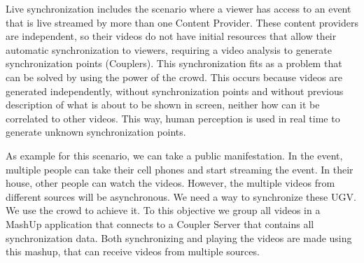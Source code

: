Live synchronization includes the scenario where a viewer has access to an event that is live streamed by more than one Content Provider. These content providers are independent, so their videos do not have initial resources that allow their automatic synchronization to viewers, requiring a video analysis to generate synchronization points (Couplers). This synchronization fits as a problem that can be solved by using the power of the crowd. This occurs because videos are generated independently, without synchronization points and without previous description of what is about to be shown in screen, neither how can it be correlated to other videos. This way, human perception is used in real time to generate unknown synchronization points. 

As example for this scenario, we can take a public manifestation. In the event, multiple people can take their cell phones and start streaming the event. In their house, other people can watch the videos. However, the multiple videos from different sources will be asynchronous. We need a way to synchronize these UGV. We use the crowd to achieve it. To this objective we group all videos in a MashUp application that connects to a Coupler Server that contains all synchronization data. Both synchronizing and playing the videos are made using this mashup, that can receive videos from multiple sources.





